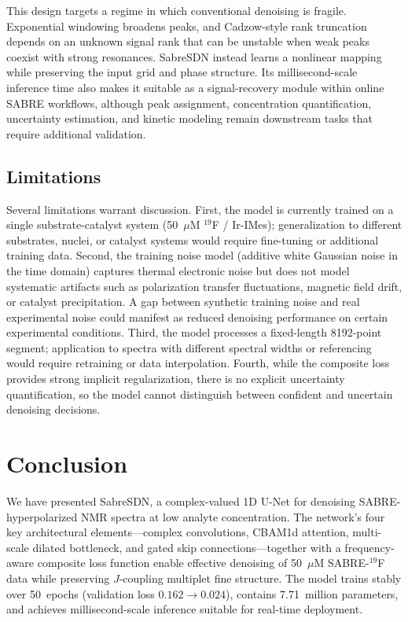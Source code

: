 \documentclass{article}
\begin{document}
This design targets a regime in which conventional denoising is fragile. Exponential windowing broadens peaks, and Cadzow-style rank truncation depends on an unknown signal rank that can be unstable when weak peaks coexist with strong resonances. SabreSDN instead learns a nonlinear mapping while preserving the input grid and phase structure. Its millisecond-scale inference time also makes it suitable as a signal-recovery module within online SABRE workflows, although peak assignment, concentration quantification, uncertainty estimation, and kinetic modeling remain downstream tasks that require additional validation.

\subsection{Limitations}

Several limitations warrant discussion. First, the model is currently trained on a single substrate-catalyst system (50~$\mu$M $^{19}$F / Ir-IMes); generalization to different substrates, nuclei, or catalyst systems would require fine-tuning or additional training data. Second, the training noise model (additive white Gaussian noise in the time domain) captures thermal electronic noise but does not model systematic artifacts such as polarization transfer fluctuations, magnetic field drift, or catalyst precipitation. A gap between synthetic training noise and real experimental noise could manifest as reduced denoising performance on certain experimental conditions. Third, the model processes a fixed-length 8192-point segment; application to spectra with different spectral widths or referencing would require retraining or data interpolation. Fourth, while the composite loss provides strong implicit regularization, there is no explicit uncertainty quantification, so the model cannot distinguish between confident and uncertain denoising decisions.


\section{Conclusion}

We have presented SabreSDN, a complex-valued 1D U-Net for denoising SABRE-hyperpolarized NMR spectra at low analyte concentration. The network's four key architectural elements---complex convolutions, CBAM1d attention, multi-scale dilated bottleneck, and gated skip connections---together with a frequency-aware composite loss function enable effective denoising of 50~$\mu$M SABRE-$^{19}$F data while preserving $J$-coupling multiplet fine structure. The model trains stably over 50~epochs (validation loss $0.162 \to 0.024$), contains 7.71~million parameters, and achieves millisecond-scale inference suitable for real-time deployment.
\end{document}

